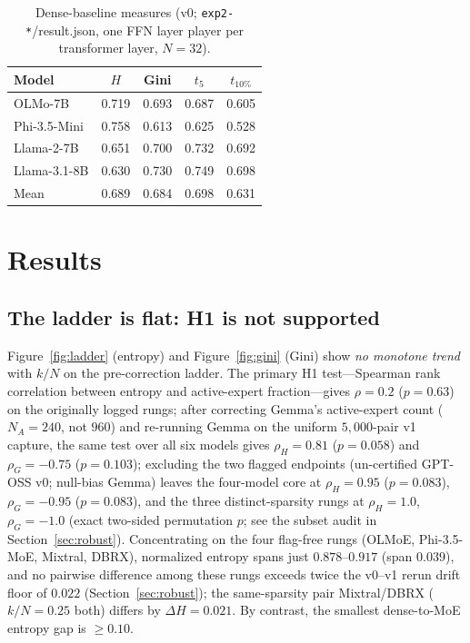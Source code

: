 \documentclass[sigconf]{acmart}
\begin{document}
\begin{table}[t]
\centering\small
\begin{tabular}{lcccc}
\toprule
Model & $H$ & Gini & $t_5$ & $t_{10\%}$ \\
\midrule
OLMo-7B        & 0.719 & 0.693 & 0.687 & 0.605 \\
Phi-3.5-Mini   & 0.758 & 0.613 & 0.625 & 0.528 \\
Llama-2-7B     & 0.651 & 0.700 & 0.732 & 0.692 \\
Llama-3.1-8B   & 0.630 & 0.730 & 0.749 & 0.698 \\
\midrule
Mean           & 0.689 & 0.684 & 0.698 & 0.631 \\
\bottomrule
\end{tabular}
\caption{Dense-baseline measures (v0; \texttt{exp2-*}/result.json, one FFN
layer player per transformer layer, $N = 32$).}
\label{tab:dense}
\end{table}

\section{Results}
\subsection{The ladder is flat: H1 is not supported}
\label{sec:h1test}
Figure~\ref{fig:ladder} (entropy) and Figure~\ref{fig:gini} (Gini) show
\emph{no monotone trend} with $k/N$ on the pre-correction ladder. The
primary H1 test---Spearman rank correlation between entropy and
active-expert fraction---gives $\rho = 0.2$ ($p = 0.63$) on the originally
logged rungs; after correcting Gemma's active-expert count
($N_A = 240$, not $960$) and re-running Gemma on the uniform $5{,}000$-pair
v1 capture, the same test over all six models gives
$\rho_H = 0.81$ ($p = 0.058$) and $\rho_G = -0.75$ ($p = 0.103$); excluding
the two flagged endpoints (un-certified GPT-OSS v0; null-bias Gemma)
leaves the four-model core at $\rho_H = 0.95$ ($p = 0.083$), $\rho_G =
-0.95$ ($p = 0.083$), and the three distinct-sparsity rungs at
$\rho_H = 1.0$, $\rho_G = -1.0$ (exact two-sided permutation $p$; see the
subset audit in Section~\ref{sec:robust}). Concentrating on the four
flag-free rungs (OLMoE, Phi-3.5-MoE, Mixtral, DBRX), normalized entropy
spans just $0.878$--$0.917$ (span $0.039$), and no pairwise difference
among these rungs exceeds twice the v0--v1 rerun drift floor of $0.022$
(Section~\ref{sec:robust}); the same-sparsity pair Mixtral/DBRX
($k/N = 0.25$ both) differs by $\Delta H = 0.021$. By contrast, the
smallest dense-to-MoE entropy gap is $\ge 0.10$.
\end{document}
